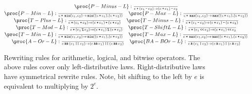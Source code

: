 \begin{figure*}[htbp!]
\[
\begin{matrix}
\proc{P-Minus-L}:{\over
e \lp \p{e_1 \lm e_2} \rightarrow \p{e \lp e_1 } \lm e_2
}\\
\proc{P-Min-L}:{\over
e \lp \LMIN\p{e_1, e_2} \rightarrow \LMIN\p{\p{e \lp e_1}, \p{e \lp e_2}}
}\quad
\proc{P-Max-L}:{\over
e \lp \LMAX\p{e_1, e_2} \rightarrow \LMAX\p{\p{e \lp e_1}, \p{e \lp e_2}}
}\\
\proc{T-Plus-L}:{\over
e \lt \p{e_1 \lp e_2} \rightarrow \p{ e \lt e_1 } \lp \p{ e \lt e_2 }
}\quad
\proc{T-Minus-L}:{\over
e \lt \p{e_1 \lm e_2} \rightarrow \p{ e\lt e_1 } \lm \p{ e \lt e_2 }
}\\
\proc{T-Mod-L}:{\over
e \lt \p{e_1 \lmod e_2}\rightarrow \p{ e \lt e_1 } \lmod \p{ e \lt e_2 }
}\quad
\proc{T-ShiftL-L}:{\over
e \lt \p{e_1 \LBSL e_2} \rightarrow \p{ e \lt e_1 } \LBSL e_2
}\\
\proc{T-Min-L}:{\over
e \lt \LMIN\p{e_1, e_2} \rightarrow \LMIN\p{\p{e \lt e_1}, \p{e \lt e_2}}
}\quad
\proc{T-Max-L}:{\over
e \lt \LMAX\p{e_1, e_2} \rightarrow \LMAX\p{\p{e \lt e_1}, \p{e \lt e_2}}
}\\
\proc{A-Or-L}:{\over
e \LAND \p{e_1 \LOR e_2}\rightarrow \p{ e \LAND e_1 } \LOR \p{ e \LAND e_2 }
}\quad
\proc{BA-BOr-L}:{\over
e \LBAND \p{e_1 \LBOR e_2}\rightarrow \p{ e \LBAND e_1 } \LBOR \p{ e \LBAND e_2
}
}
\end{matrix}
\]
\caption[]{Rewriting rules for arithmetic, logical, and bitwise operators. The
above rules cover only left-distributive laws. Right-distributive laws have
symmetrical rewrite rules.  Note, bit shifting to the left by $e$ is equivalent
to multiplying by $2^e$.}
\label{figure:rewriting}
\end{figure*}




